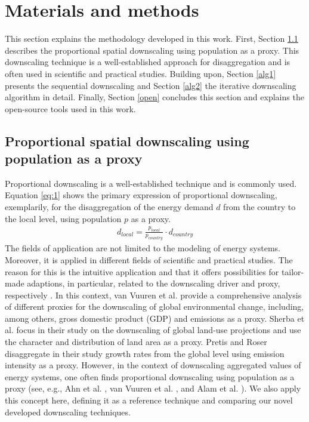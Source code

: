 \section{Materials and methods}\label{methodology}
This section explains the methodology developed in this work. First, Section \ref{pop} describes the proportional spatial downscaling using population as a proxy. This downscaling technique is a well-established approach for disaggregation and is often used in scientific and practical studies. Building upon, Section \ref{alg1} presents the sequential downscaling and Section \ref{alg2} the iterative downscaling algorithm in detail. Finally, Section \ref{open} concludes this section and explains the open-source tools used in this work.

\subsection{Proportional spatial downscaling using population as a proxy}\label{pop}
Proportional downscaling is a well-established technique and is commonly used. Equation \ref{eq:1} shows the primary expression of proportional downscaling, exemplarily, for the disaggregation of the energy demand $d$ from the country to the local level, using population $p$ as a proxy.  
\begin{align}\label{eq:1}
d_{local}=\frac{p_{local}}{p_{country}} \cdot d_{country}
\end{align}
The fields of application are not limited to the modeling of energy systems. Moreover, it is applied in different fields of scientific and practical studies. The reason for this is the intuitive application and that it offers possibilities for tailor-made adaptions, in particular, related to the downscaling driver and proxy, respectively \cite{van2006downscaling}. In this context, van Vuuren et al. \cite{van2006downscaling} provide a comprehensive analysis of different proxies for the downscaling of global environmental change, including, among others, gross domestic product (GDP) and emissions as a proxy. Sherba et al. \cite{sherba2015downscaling} focus in their study on the downscaling of global land-use projections and use the character and distribution of land area as a proxy. Pretis and Roser \cite{pretis2017carbon} disaggregate in their study growth rates from the global level using emission intensity as a proxy. However, in the context of downscaling aggregated values of energy systems, one often finds proportional downscaling using population as a proxy (see, e.g., Ahn et al. \cite{ahn2019downscaled}, van Vuuren et al. \cite{van2010downscaling}, and Alam et al. \cite{alam2018downscaling}). We also apply this concept here, defining it as a reference technique and comparing our novel developed downscaling techniques.\vspace{0.3cm}

